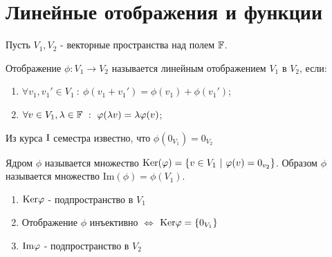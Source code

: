 \section{Линейные отображения и функции}
    Пусть $V_1, V_2$ - векторные пространства над полем $\F$.
    \begin{definition}
        Отображение $\phi: V_1 \rightarrow V_2$ называется линейным отображением $V_1$ в $V_2$, если:
        \begin{enumerate}
            \item $\forall v_1, v_1'\in V_1 \ : \ \phi(v_1 + v_1') = \phi(v_1) + \phi(v_1')$;
            \item $\forall v \in V_1, \lambda \in \F \ : \ \phi(\lambda v) = \lambda\phi(v)$;
        \end{enumerate}
    \end{definition}
        Из курса $\textup{I}$ семестра известно, что $\phi (0_{V_1}) = 0_{V_2}$
    \begin{definition}
        Ядром $\phi$ называется множество $\textup{Ker}(\phi) = \{v \in V_1 \ | \ \phi(v) = 0_{v_2}\}$. Образом $\phi$ называется множество $\text{Im}(\phi) = \phi(V_1)$.
    \end{definition}
    \begin{subtheorem}
    \begin{enumerate}
      \item $\textup{Ker}\phi$ - подпространство в $V_1$
      \item Отображение $\phi$ инъективно $\Longleftrightarrow$ $\textup{Ker}\phi=\{0_{V_1}\}$
      \item $\textup{Im}\phi$ - подпространство в $V_2$
    \end{enumerate}
  \end{subtheorem}
